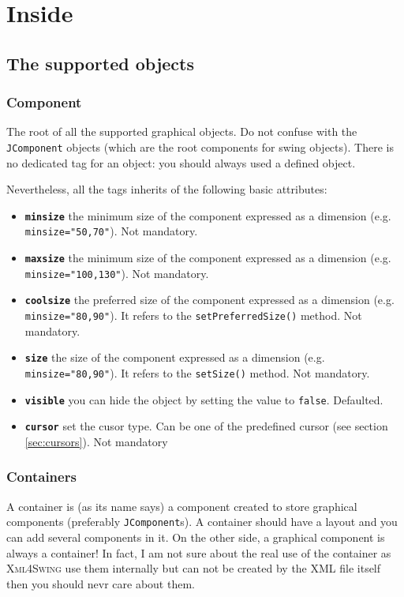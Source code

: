 \documentclass[a4paper,onecolumn,10pt]{book}
\title{\xmlswing}
\author{\small William R (\url{http://wrey.free.fr/})\\\textsc{SourceForge.org}}
\newcommand{\jmethod}[1]{\texttt{\small #1()}}
\newcommand{\jclass}[1]{\texttt{\small #1}}
\newcommand{\xmlswing}{\textsc{Xml4Swing}}
\newcommand{\attr}[1]{\texttt{\small \textbf{#1}}}
\begin{document}
\maketitle

\tableofcontents
\sloppy



\chapter{Inside}

\section{The supported objects}
\subsection{\label{sec:Component}Component}
The root of all the supported graphical objects. Do not confuse with
the \jclass{JComponent} objects (which are the root components for
swing objects). There is no dedicated tag for an object: you should
always used a defined object.

Nevertheless, all the tags inherits of the following basic attributes:
\begin{itemize}
	\item \attr{minsize} the minimum size of the component expressed
		as a dimension (e.g. \verb|minsize="50,70"|). Not mandatory.
	\item \attr{maxsize} the minimum size of the component expressed
		as a dimension (e.g. \verb|minsize="100,130"|). Not mandatory.
	\item \attr{coolsize} the preferred size of the component expressed
		as a dimension (e.g. \verb|minsize="80,90"|). It refers
		to the \jmethod{setPreferredSize} method. Not mandatory.
	\item \attr{size} the size of the component expressed
		as a dimension (e.g. \verb|minsize="80,90"|). It refers
		to the \jmethod{setSize} method. Not mandatory.
	\item \attr{visible} you can hide the object by setting the
	  value to \verb|false|. Defaulted.
	\item \attr{cursor} set the cusor type. Can be one of the predefined
	  cursor (see section \ref{sec:cursors}). Not mandatory
\end{itemize}

\subsection{\label{sec:Container}Containers}
A container is (as its name says) a component created to store
graphical components (preferably \jclass{JComponent}s). A container
should have a layout and you can add several components in it.
On the other side, a graphical component is always a container! In fact,
I am not sure about the real use of the container as \xmlswing{}
use them internally but can not be created by the XML file itself
then you should nevr care about them.
\end{document}
